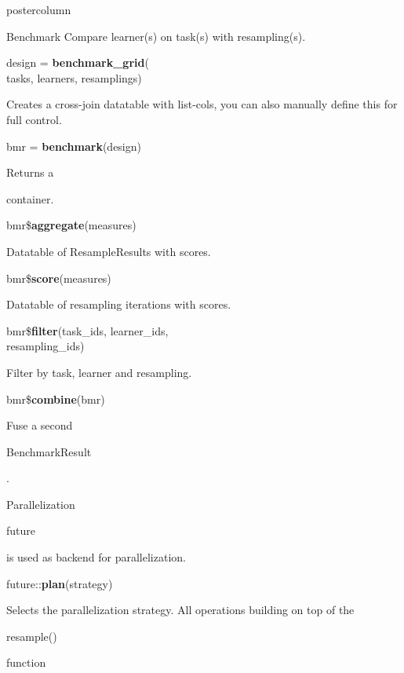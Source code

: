 \documentclass{beamer}
\newcommand{\codeinline}[1]{\begin{codeboxinline}#1\end{codeboxinline}}
\begin{document}
\begin{withoutheader}
\begin{frame}[fragile]{}
\begin{columns}
\begin{column}{.245\textwidth}
\begin{beamercolorbox}[center]{postercolumn}
\begin{minipage}{.98\textwidth}
{\begin{myblock}{Benchmark}
                            Compare learner(s) on task(s) with resampling(s).
							\\
							\begin{codeboxmultiline}[width=19.4cm]
								design = \textbf{benchmark\_grid}(\\
								\hspace*{1ex}tasks, learners, resamplings)
							\end{codeboxmultiline}
							Creates a cross-join datatable with list-cols, you can also manually define this for full control.
							\\
							\begin{codebox}
								bmr = \textbf{benchmark}(design)
							\end{codebox}
							Returns a \codeinline{}
							container.
							\\
							\begin{codebox}
								bmr\$\textbf{aggregate}(measures)
							\end{codebox}
							Datatable of ResampleResults with scores.
							\\
							\begin{codebox}
								bmr\$\textbf{score}(measures)
							\end{codebox}
							Datatable of resampling iterations with scores. 
							\\
							\begin{codeboxmultiline}[width=21.5cm]
								bmr\$\textbf{filter}(task\_ids, learner\_ids,\\ 
								\hspace*{1ex}resampling\_ids)
							\end{codeboxmultiline}
							Filter by task, learner and resampling. 
							\\
							\begin{codebox}
								bmr\$\textbf{combine}(bmr)
							\end{codebox}
							Fuse a second \codeinline{BenchmarkResult}. 
						\end{myblock}
						\begin{myblock}{Parallelization}
							\codeinline{future} is used as backend for parallelization.
							\\
							\begin{codebox}
								future::\textbf{plan}(strategy)
							\end{codebox}
							Selects the parallelization strategy. 
							All operations building on top of the \codeinline{resample()} function 

\end{myblock}}
\end{minipage}
\end{beamercolorbox}
\end{column}
\end{columns}
\end{frame}
\end{withoutheader}
\end{document}
